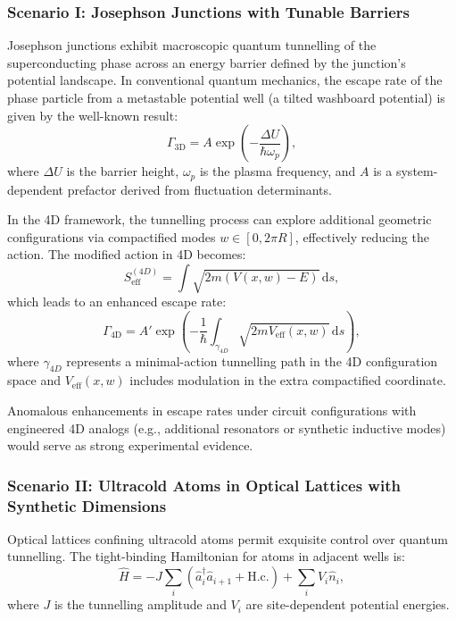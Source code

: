\documentclass[12pt]{article}
\begin{document}
\subsubsection*{Scenario I: Josephson Junctions with Tunable Barriers}

Josephson junctions exhibit macroscopic quantum tunnelling of the superconducting phase across an energy barrier defined by the junction's potential landscape. In conventional quantum mechanics, the escape rate of the phase particle from a metastable potential well (a tilted washboard potential) is given by the well-known result:
\begin{equation}
\Gamma_{\text{3D}} = A \exp\left( -\frac{\Delta U}{\hbar \omega_p} \right),
\label{eq:josephson_3d}
\end{equation}
where \( \Delta U \) is the barrier height, \( \omega_p \) is the plasma frequency, and \( A \) is a system-dependent prefactor derived from fluctuation determinants.

In the 4D framework, the tunnelling process can explore additional geometric configurations via compactified modes \( w \in [0, 2\pi R] \), effectively reducing the action. The modified action in 4D becomes:
\begin{equation}
S_{\text{eff}}^{(4D)} = \int \sqrt{2m(V(x, w) - E)} \, \mathrm{d}s,
\end{equation}
which leads to an enhanced escape rate:
\begin{equation}
\Gamma_{\text{4D}} = A' \exp\left( -\frac{1}{\hbar} \int_{\gamma_{4D}} \sqrt{2m V_{\text{eff}}(x, w)} \, \mathrm{d}s \right),
\label{eq:josephson_4d}
\end{equation}
where \( \gamma_{4D} \) represents a minimal-action tunnelling path in the 4D configuration space and \( V_{\text{eff}}(x, w) \) includes modulation in the extra compactified coordinate.

Anomalous enhancements in escape rates under circuit configurations with engineered 4D analogs (e.g., additional resonators or synthetic inductive modes) would serve as strong experimental evidence.

\subsubsection*{Scenario II: Ultracold Atoms in Optical Lattices with Synthetic Dimensions}

Optical lattices confining ultracold atoms permit exquisite control over quantum tunnelling. The tight-binding Hamiltonian for atoms in adjacent wells is:
\begin{equation}
\hat{H} = -J \sum_{i} (\hat{a}^\dagger_{i} \hat{a}_{i+1} + \text{H.c.}) + \sum_{i} V_i \hat{n}_i,
\end{equation}
where \( J \) is the tunnelling amplitude and \( V_i \) are site-dependent potential energies.
\end{document}
